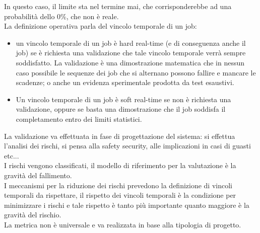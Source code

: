 \documentclass[12pt, oneside]{extbook}
\begin{document}
In questo caso, il limite sta nel termine mai, che corrisponderebbe ad una probabilità dello 0\%, che non è reale.\\ La definizione operativa parla del vincolo temporale di un job:
\begin{itemize}
\item un vincolo temporale di un job è hard real-time (e di conseguenza anche il job) se è richiesta una validazione che tale vincolo temporale verrà sempre soddisfatto. La validazione è una dimostrazione matematica che in nessun caso possibile le sequenze dei job che si alternano possono fallire e mancare le scadenze; o anche un evidenza sperimentale prodotta da test esaustivi.
\item Un vincolo temporale di un job è soft real-time se non è richiesta una validazione, oppure se basta una dimostrazione che il job soddisfa il completamento entro dei limiti statistici.
\end{itemize}
La validazione va effettuata in fase di progettazione del sistema: si effettua l'analisi dei rischi, si pensa alla safety security, alle implicazioni in casi di guasti etc...\\ I rischi vengono classificati, il modello di riferimento per la valutazione è la gravità del fallimento.\\ I meccanismi per la riduzione dei rischi prevedono la definizione di vincoli temporali da rispettare, il rispetto dei vincoli temporali è la condizione per minimizzare i rischi e tale rispetto è tanto più importante quanto maggiore è la gravità del rischio.\\ La metrica non è universale e va realizzata in base alla tipologia di progetto.
\end{document}
